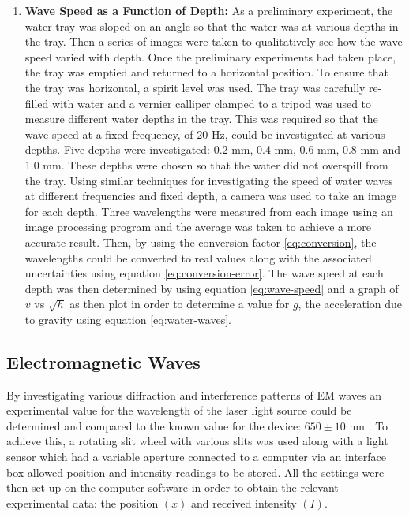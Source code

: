 \documentclass{article}
\begin{document}
\begin{enumerate}
  \item \textbf{Wave Speed as a Function of Depth:} As a preliminary experiment, the water tray was sloped on an angle so that the water was at various depths in the tray. Then a series of images were taken to qualitatively see how the wave speed varied with depth. Once the preliminary experiments had taken place, the tray was emptied and returned to a horizontal position. To ensure that the tray was horizontal, a spirit level was used. The tray was carefully re-filled with water and a vernier calliper clamped to a tripod was used to measure different water depths in the tray. This was required so that the wave speed at a fixed frequency, of 20 Hz, could be investigated at various depths. Five depths were investigated: 0.2 mm, 0.4 mm, 0.6 mm, 0.8 mm and 1.0 mm. These depths were chosen so that the water did not overspill from the tray. Using similar techniques for investigating the speed of water waves at different frequencies and fixed depth, a camera was used to take an image for each depth. Three wavelengths were measured from each image using an image processing program and the average was taken to achieve a more accurate result. Then, by using the conversion factor \eqref{eq:conversion}, the wavelengths could be converted to real values along with the associated uncertainties using equation \eqref{eq:conversion-error}. The wave speed at each depth was then determined by using equation \eqref{eq:wave-speed} and a graph of $v$ vs $\sqrt{h}$ as then plot in order to determine a value for $g$, the acceleration due to gravity using equation \eqref{eq:water-waves}.
\end{enumerate}

\subsection{Electromagnetic Waves}
\label{ssec:diffraction-method}

By investigating various diffraction and interference patterns of EM waves an experimental value for the wavelength of the laser light source could be determined and compared to the known value for the device: $650 \pm 10$ nm \cite{Web02}. To achieve this, a rotating slit wheel with various slits was used along with a light sensor which had a variable aperture connected to a computer via an interface box allowed position and intensity readings to be stored. All the settings were then set-up on the computer software in order to obtain the relevant experimental data: the position $(x)$ and received intensity $(I)$.
\end{document}
